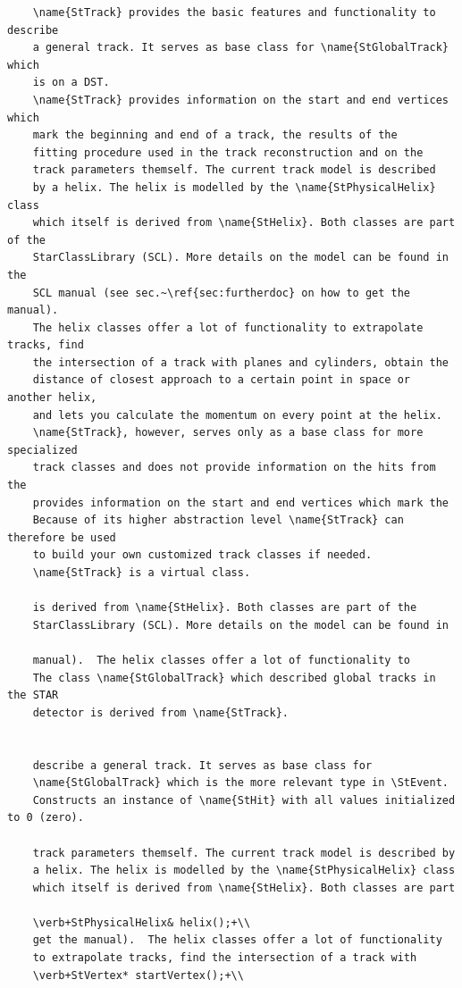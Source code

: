 \begin{enumerate}
\begin{Entry}
\begin{Entry}
{\begin{verbatim}
    \name{StTrack} provides the basic features and functionality to describe
    a general track. It serves as base class for \name{StGlobalTrack} which
    is on a DST.
    \name{StTrack} provides information on the start and end vertices which
    mark the beginning and end of a track, the results of the
    fitting procedure used in the track reconstruction and on the
    track parameters themself. The current track model is described
    by a helix. The helix is modelled by the \name{StPhysicalHelix} class
    which itself is derived from \name{StHelix}. Both classes are part of the
    StarClassLibrary (SCL). More details on the model can be found in the
    SCL manual (see sec.~\ref{sec:furtherdoc} on how to get the manual).
    The helix classes offer a lot of functionality to extrapolate tracks, find
    the intersection of a track with planes and cylinders, obtain the
    distance of closest approach to a certain point in space or another helix,
    and lets you calculate the momentum on every point at the helix.
    \name{StTrack}, however, serves only as a base class for more specialized
    track classes and does not provide information on the hits from the
    provides information on the start and end vertices which mark the
    Because of its higher abstraction level \name{StTrack} can therefore be used
    to build your own customized track classes if needed.
    \name{StTrack} is a virtual class.
    
    is derived from \name{StHelix}. Both classes are part of the
    StarClassLibrary (SCL). More details on the model can be found in

    manual).  The helix classes offer a lot of functionality to
    The class \name{StGlobalTrack} which described global tracks in the STAR
    detector is derived from \name{StTrack}.
    

    describe a general track. It serves as base class for
    \name{StGlobalTrack} which is the more relevant type in \StEvent.
    Constructs an instance of \name{StHit} with all values initialized to 0 (zero).

    track parameters themself. The current track model is described by
    a helix. The helix is modelled by the \name{StPhysicalHelix} class
    which itself is derived from \name{StHelix}. Both classes are part
    
    \verb+StPhysicalHelix& helix();+\\
    get the manual).  The helix classes offer a lot of functionality
    to extrapolate tracks, find the intersection of a track with
    \verb+StVertex* startVertex();+\\
    

\end{verbatim}}
\end{Entry}
\end{Entry}
\end{enumerate}
